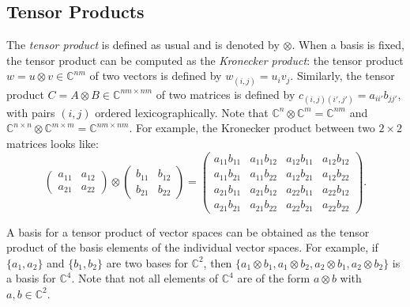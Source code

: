 \documentclass[12pt]{dalthesis}
\begin{document}
\subsection{Tensor Products}
\label{tensor products}
The \emph{tensor product} is defined as usual and is denoted by $\otimes$. When a basis is fixed, the tensor product can be computed as the \emph{Kronecker product}: the tensor product $w = u \otimes v \in \mathbb{C}^{nm}$ of two vectors is defined by $w_{(i, j)} = u_iv_j$. Similarly, the tensor product $C = A \otimes B \in \mathbb{C}^{nm \times nm}$ of two matrices is defined by $c_{(i, j)(i', j')} = a_{ii'}b_{jj'}$, with pairs $(i, j)$ ordered lexicographically. Note that $\mathbb{C}^n \otimes \mathbb{C}^m = \mathbb{C}^{nm}$ and $\mathbb{C}^{n \times n} \otimes \mathbb{C}^{m \times m} = \mathbb{C}^{nm \times nm}$. For example, the Kronecker product between two $2 \times 2$ matrices looks like:
\begin{equation*}
\begin{pmatrix}
a_{11} & a_{12} \\
a_{21} & a_{22} 
\end{pmatrix} 
\otimes 
\begin{pmatrix}
b_{11} & b_{12} \\
b_{21} & b_{22} 
\end{pmatrix} 
=
\begin{pmatrix}
a_{11}b_{11} & a_{11}b_{12} & a_{12}b_{11} & a_{12}b_{12} \\
a_{11}b_{21} & a_{11}b_{22} & a_{12}b_{21} & a_{12}b_{22} \\
a_{21}b_{11} & a_{21}b_{12} & a_{22}b_{11} & a_{22}b_{12} \\
a_{21}b_{21} & a_{21}b_{22} & a_{22}b_{21} & a_{22}b_{22}
\end{pmatrix}.
\end{equation*}


A basis for a tensor product of vector spaces can be obtained as the tensor product of the basis elements of the individual vector spaces. For example, if $\{ a_1, a_2 \}$ and $\{ b_1 , b_2  \}$ are two bases for $\mathbb{C}^2$, then $\{ a_1 \otimes b_1, a_1 \otimes b_2, a_2 \otimes b_1, a_2 \otimes b_2 \}$ is a basis for $\mathbb{C}^4$. Note that not all elements of $\mathbb{C}^4$ are of the form $a \otimes b$ with $a, b \in \mathbb{C}^2$.
\end{document}
